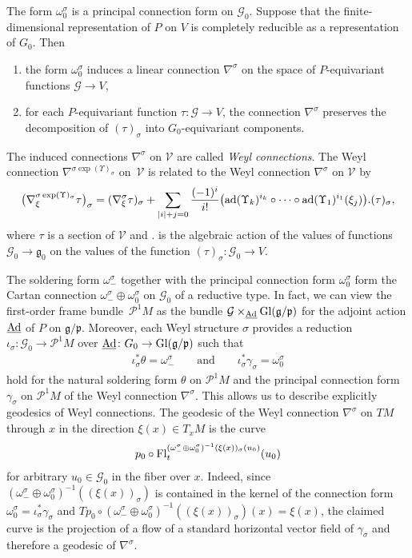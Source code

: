 \documentclass[pdftex]{sigma}
\newcommand{\om}{\omega}
\newcommand{\si}{\sigma}
\newcommand{\un}{\underline}
\newcommand{\ba}{\mathcal{G}}
\newcommand{\fg}{\mathfrak g}
\newcommand{\fp}{\mathfrak p}
\newcommand{\Ad}{{\rm Ad}}
\newcommand{\Fl}{{\rm Fl}}
\newcommand{\na}{\nabla}
\newcommand{\U}{\Upsilon}
\newcommand{\ad}{{\rm ad}}
\numberwithin{equation}{section}
\begin{document}
The form $\om_{0}^\si$ is a principal connection form on $\ba_0$. Suppose that the f\/inite-dimensional representation of $P$ on $V$ is completely reducible as a representation of $G_0$. Then
\begin{enumerate}\itemsep=0pt
\item[1)] the form $\om_{0}^\si$ induces a linear connection $\nabla^\si$ on the space of $P$-equivariant functions $\ba\to V$,
\item[2)] for each $P$-equivariant function $\tau\colon \ba\to V$, the connection $\nabla^\si$ preserves the decomposition of $(\tau)_\si$ into $G_0$-equivariant components.
\end{enumerate}

The induced connections $\na^\si\!$ on $\mathcal{V}$ are called \emph{Weyl connections}. The Weyl connection $\na^{\si\exp (\U)_\si}\!\!$ on~$\mathcal{V}$ is related to the Weyl connection $\na^\si$ on $\mathcal{V}$ by
\begin{gather} \label{change-wc}
\big(\na^{\si\exp (\U)_\si }_\xi\tau\big)_\si =(\na^\si_\xi\tau)_\si + \sum_{|i|+j=0} \frac{(-1)^{i}}{i!} \big( \ad(\U_k)^{i_k} \circ \cdots \circ \ad(\U_1)^{i_1}(\xi_j)\big). (\tau)_\si,
\end{gather}
where $\tau$ is a section of $\mathcal{V}$ and $.$ is the algebraic action of the values of functions $\ba_0\to \fg_0$ on the values of the function $(\tau)_\si\colon \ba_0\to V$.

The soldering form $\om_-^\si$ together with the principal connection form $\om_{0}^\si$ form the Cartan connection $\om_-^\si\oplus\om_{0}^\si$ on $\ba_0$ of a reductive type. In fact, we can view the f\/irst-order frame bund\-le~$\mathcal{P}^1M$ as the bundle $\ba\times_{\un \Ad}{\rm Gl}(\fg/\fp)$ for the adjoint action $\un \Ad$ of $P$ on $\fg/\fp$. Moreover, each Weyl structure $\si$ provides a reduction $\iota_\si\colon \ba_0\to\mathcal{P}^1M$ over $\un \Ad\colon G_0\to {\rm Gl}(\fg/\fp)$ such that
\begin{gather*}\iota_\si^*\theta=\om_-^\si \qquad \text{and} \qquad \iota_\si^*\gamma_\si=\om_{0}^\si\end{gather*}
hold for the natural soldering form $\theta$ on $\mathcal{P}^1M$ and the principal connection form $\gamma_\si$ on $\mathcal{P}^1M$ of the Weyl connection $\nabla^\si$. This allows us to describe explicitly geodesics of Weyl connections. The geodesic of the Weyl connection $\nabla^\si$ on $TM$ through $x$ in the direction $\xi(x) \in T_xM$ is the curve \begin{gather}\label{geod}
p_0 \circ \Fl^{(\om_-^\si\oplus\om_{0}^\si)^{-1}(\xi(x))_\si(u_0)}_t(u_0)
\end{gather} for arbitrary $u_0\in \ba_0$ in the f\/iber over $x$. Indeed, since $(\om_-^\si\oplus\om_{0}^\si)^{-1}((\xi(x))_\si)$ is contained in the kernel of the connection form $\om_0^\si=\iota_\si^*\gamma_\si$ and $Tp_0\circ (\om_-^\si\oplus\om_{0}^\si)^{-1}((\xi(x))_\si)(x)=\xi(x)$, the claimed curve is the projection of a f\/low of a standard horizontal vector f\/ield of $\gamma_\si$ and therefore a geodesic of $\nabla^\si$.
\end{document}
